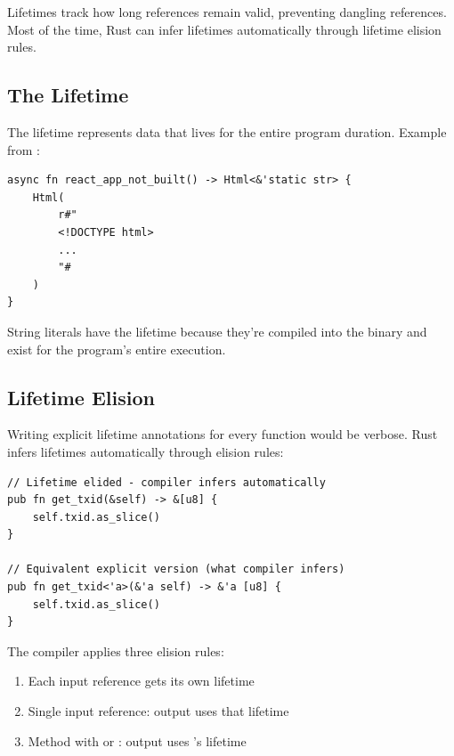 Lifetimes track how long references remain valid, preventing dangling references. Most of the time, Rust can infer lifetimes automatically through lifetime elision rules.

\subsection{The  Lifetime}
\label{subsec:ch24-static-lifetime}

The  lifetime represents data that lives for the entire program duration. Example from :

\begin{listing}[htbp]
\caption{Static lifetime for string literals}
\label{lst:ch24-static}
\begin{verbatim}
async fn react_app_not_built() -> Html<&'static str> {
    Html(
        r#"
        <!DOCTYPE html>
        ...
        "#
    )
}
\end{verbatim}
\end{listing}

String literals have the  lifetime because they're compiled into the binary and exist for the program's entire execution.

\subsection{Lifetime Elision}
\label{subsec:ch24-lifetime-elision}

Writing explicit lifetime annotations for every function would be verbose. Rust infers lifetimes automatically through elision rules:

\begin{listing}[htbp]
\caption{Lifetime elision example}
\label{lst:ch24-lifetime-elision}
\begin{verbatim}
// Lifetime elided - compiler infers automatically
pub fn get_txid(&self) -> &[u8] {
    self.txid.as_slice()
}

// Equivalent explicit version (what compiler infers)
pub fn get_txid<'a>(&'a self) -> &'a [u8] {
    self.txid.as_slice()
}
\end{verbatim}
\end{listing}

The compiler applies three elision rules:
\begin{enumerate}
  \item Each input reference gets its own lifetime
  \item Single input reference: output uses that lifetime
  \item Method with  or : output uses 's lifetime
\end{enumerate}

